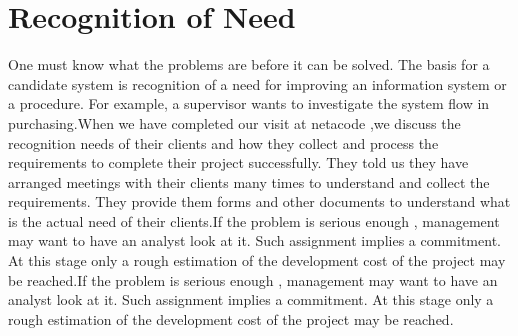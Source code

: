 \documentclass[a4paper,12pt]{report}
\begin{document}
\section{Recognition of Need}
One must know what the problems are before it can be solved. The basis for a candidate system is recognition of a need for improving an information system or a procedure. For example, a supervisor wants to investigate the system flow in purchasing.When we have completed our visit at netacode ,we discuss the recognition needs of their clients and how they collect and process the requirements to complete their project  successfully. They told us they have arranged meetings with their clients many times to understand and collect the requirements. They provide them forms and other documents to understand what is the actual need of their clients.If the problem is serious enough , management may want to have an analyst look at it. Such assignment  implies a commitment. At this stage only a rough estimation of the development cost of the project may be reached.If the problem is serious enough , management may want to have an analyst look at it. Such assignment  implies a commitment. At this stage only a rough estimation of the development cost of the project may be reached.
\end{document}
